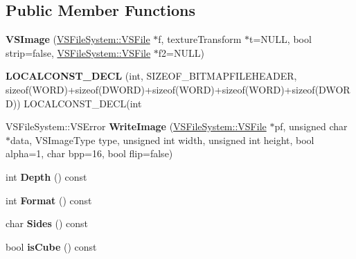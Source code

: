 \subsection*{Public Member Functions}
\begin{DoxyCompactItemize}
\item 
{\bfseries V\+S\+Image} (\hyperlink{classVSFileSystem_1_1VSFile}{V\+S\+File\+System\+::\+V\+S\+File} $\ast$f, texture\+Transform $\ast$t=N\+U\+LL, bool strip=false, \hyperlink{classVSFileSystem_1_1VSFile}{V\+S\+File\+System\+::\+V\+S\+File} $\ast$f2=N\+U\+LL)\hypertarget{classVSImage_aafad6284971c50ff79601ff280e64f1a}{}\label{classVSImage_aafad6284971c50ff79601ff280e64f1a}

\item 
{\bfseries L\+O\+C\+A\+L\+C\+O\+N\+S\+T\+\_\+\+D\+E\+CL} (int, S\+I\+Z\+E\+O\+F\+\_\+\+B\+I\+T\+M\+A\+P\+F\+I\+L\+E\+H\+E\+A\+D\+ER, sizeof(W\+O\+RD)+sizeof(D\+W\+O\+RD)+sizeof(W\+O\+RD)+sizeof(W\+O\+RD)+sizeof(D\+W\+O\+RD)) L\+O\+C\+A\+L\+C\+O\+N\+S\+T\+\_\+\+D\+E\+CL(int\hypertarget{classVSImage_aa2aa9a9201cc3b5e0447d9bd0d239966}{}\label{classVSImage_aa2aa9a9201cc3b5e0447d9bd0d239966}

\item 
V\+S\+File\+System\+::\+V\+S\+Error {\bfseries Write\+Image} (\hyperlink{classVSFileSystem_1_1VSFile}{V\+S\+File\+System\+::\+V\+S\+File} $\ast$pf, unsigned char $\ast$data, V\+S\+Image\+Type type, unsigned int width, unsigned int height, bool alpha=1, char bpp=16, bool flip=false)\hypertarget{classVSImage_a9e1a4bec79a50a0732fb72bb069d028d}{}\label{classVSImage_a9e1a4bec79a50a0732fb72bb069d028d}

\item 
int {\bfseries Depth} () const \hypertarget{classVSImage_acf0c6ed8994c38bcf5daba61fbd541cc}{}\label{classVSImage_acf0c6ed8994c38bcf5daba61fbd541cc}

\item 
int {\bfseries Format} () const \hypertarget{classVSImage_a9891c096cdb1a4a36dae5bb86cadc688}{}\label{classVSImage_a9891c096cdb1a4a36dae5bb86cadc688}

\item 
char {\bfseries Sides} () const \hypertarget{classVSImage_ab01b7883d2c3d32db241ad88c4d47bf0}{}\label{classVSImage_ab01b7883d2c3d32db241ad88c4d47bf0}

\item 
bool {\bfseries is\+Cube} () const \hypertarget{classVSImage_ac079fd14568ed69b618d423c2dcf81f1}{}\label{classVSImage_ac079fd14568ed69b618d423c2dcf81f1}

\end{DoxyCompactItemize}
